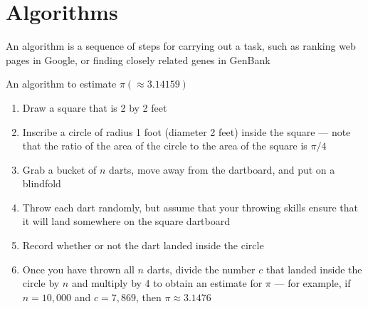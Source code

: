 \documentclass[8pt,a4paper,compress]{beamer}
\begin{document}
\section{Algorithms}
\begin{frame}[fragile]
\pause

An algorithm is a sequence of steps for carrying out a task, such as ranking web pages in Google, or finding closely related genes in GenBank

\pause
\bigskip


\begin{minipage}{200pt}
An algorithm to estimate $\pi (\approx 3.14159)$

\begin{enumerate}
\item Draw a square that is 2 by 2 feet
\item Inscribe a circle of radius 1 foot (diameter 2 feet) inside the square --- note that the ratio of the area of the circle to the area of the square is $\pi/4$
\item Grab a bucket of $n$ darts, move away from the dartboard, and put on a blindfold
\item Throw each dart randomly, but assume that your throwing skills ensure that it will land somewhere on the square dartboard
\item Record whether or not the dart landed inside the circle
\item Once you have thrown all $n$ darts, divide the number $c$ that landed inside the circle by $n$ and multiply by 4 to obtain an estimate for $\pi$ --- for example, if $n = 10,000$ and $c = 7,869$, then $\pi \approx 3.1476$
\end{enumerate}
\end{minipage}%
\hfill
\begin{minipage}{100pt}
\begin{center}
\end{center}
\end{minipage}
\end{frame}
\end{document}
